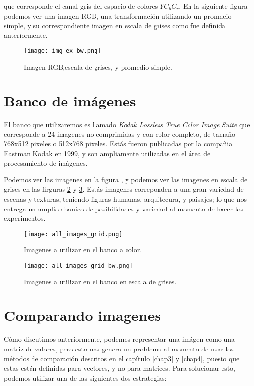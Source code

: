 que corresponde el canal gris del espacio de colores $YC_bC_r$. En la siguiente figura podemos ver una imagen RGB, una transformaci\'on utilizando un promdeio simple, y su correspondiente imagen en escala de grises como fue definida anteriormente.

\begin{figure}[H]
    \centering
    \texttt{[image: img\_ex\_bw.png]}
    \caption{Imagen RGB,escala de grises, y promedio simple.}
    \label{fig:rgb2gray}
\end{figure}


\section{Banco de im\'agenes}

El banco que utilizaremos es llamado \textit{Kodak Lossless True Color Image Suite
}\cite{KodakLosslessTrueColorImageSuite} que corresponde a 24 imagenes no comprimidas y con color completo, de tama\~no 768x512 pixeles o 512x768 pixeles. Est\'as fueron publicadas por la compa\~nia Eastman Kodak en 1999, y son ampliamente utilizadas en el \'area de procesamiento de im\'agenes. 

Podemos ver las imagenes en la figura , y podemos ver las imagenes en escala de grises en las firguras \ref{fig:banco_color} y \ref{fig:banco_gris}. Est\'as imagenes correponden a una gran variedad de escenas y texturas, teniendo figuras humanas, arquitecura, y paisajes; lo que nos entrega un amplio abanico de posibilidades y variedad al momento de hacer los experimentos.

\begin{figure}[H]
    \centering
    \texttt{[image: all\_images\_grid.png]}
    \caption{Imagenes a utilizar en el banco a color.}
    \label{fig:banco_color}
\end{figure}

\begin{figure}[H]
    \centering
    \texttt{[image: all\_images\_grid\_bw.png]}
    \caption{Imagenes a utilizar en el banco en escala de grises.}
    \label{fig:banco_gris}
\end{figure}


\section{Comparando imagenes}

Cómo discutimos anteriormente, podemos representar una im\'agen como una matriz de valores, pero esto nos genera un problema al momento de usar los m\'etodos de comparaci\'on descritos en el cap\'itulo \ref{chap3} y \ref{chap4}, puesto que estas est\'an definidas para vectores, y no para matrices. Para solucionar esto, podemos utilizar una de las siguientes dos estrategias:

